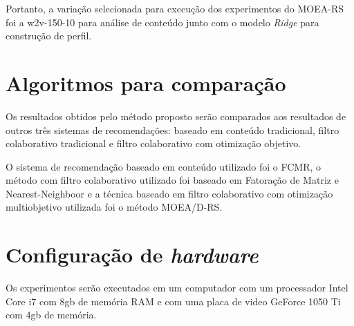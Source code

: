 Portanto, a variação selecionada para execução dos experimentos do MOEA-RS foi a  w2v-150-10 para análise de conteúdo junto com o modelo \textit{Ridge} para construção de perfil.
\section{Algoritmos para comparação}
Os resultados obtidos pelo método proposto serão comparados aos resultados de outros três sistemas de recomendações: baseado em conteúdo tradicional, filtro colaborativo tradicional e filtro colaborativo com otimização objetivo. 

O sistema de recomendação baseado em conteúdo utilizado foi o FCMR, o método com filtro colaborativo utilizado foi baseado em Fatoração de Matriz e Nearest-Neighboor e a técnica baseado em filtro colaborativo com otimização multiobjetivo utilizada foi o método MOEA/D-RS.

\section{Configuração de \textit{hardware}}
Os experimentos serão executados em um computador com um processador Intel Core i7 com 8gb de memória RAM e com uma placa de video GeForce 1050 Ti com 4gb de memória. 

